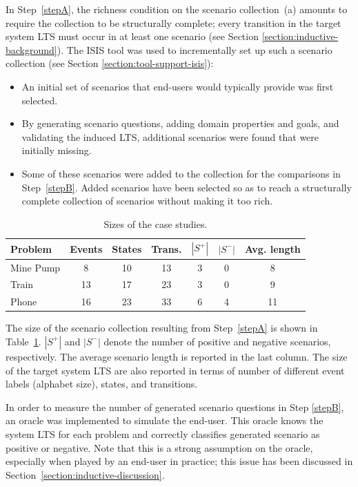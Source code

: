 In Step~\ref{stepA}, the richness condition on the scenario collection~(a) amounts to require the collection to be structurally complete; every transition in the target system LTS must occur in at least one scenario (see Section \ref{section:inductive-background}). The ISIS tool was used to incrementally set up such a scenario collection (see Section \ref{section:tool-support-isis}):
\begin{itemize}
\item An initial set of scenarios that end-users would typically provide was first selected.
\item By generating scenario questions, adding domain properties and goals, and validating the induced LTS, additional scenarios were found that were initially missing. 
\item Some of these scenarios were added to the collection for the comparisons in Step~\ref{stepB}. Added scenarios have been selected so as to reach a structurally complete collection of scenarios without making it too rich.
\end{itemize}

\begin{table}[H]
\centering
\begin{tabular}{|l||c|c|c||c|c|c|}\hline
Problem  & Events & States & Trans. & $|S^+|$ & $|S^-|$ & Avg. length\\\hline\hline
Mine Pump& 8      & 10     & 13          & 3     & 0     & 8\\\hline
Train    & 13     & 17     & 23          & 3     & 0     & 9\\\hline
Phone    & 16     & 23     & 33          & 6     & 4     & 11\\\hline
\end{tabular}
\caption{Sizes of the case studies.\label{CaseStudies}}
\end{table}

The size of the scenario collection resulting from Step~\ref{stepA} is shown in Table~\ref{CaseStudies}. $|S^+|$ and $|S^-|$ denote the number of positive and negative scenarios, respectively. The average scenario length is reported in the last column. The size of the target system LTS are also reported in terms of number of different event labels (alphabet size), states, and transitions. 

In order to measure the number of generated scenario questions in Step \ref{stepB}, an oracle was implemented to simulate the end-user. This oracle knows the system LTS for each problem and correctly classifies generated scenario as positive or negative. Note that this is a strong assumption on the oracle, especially when played by an end-user in practice; this issue has been discussed in Section~\ref{section:inductive-discussion}.

